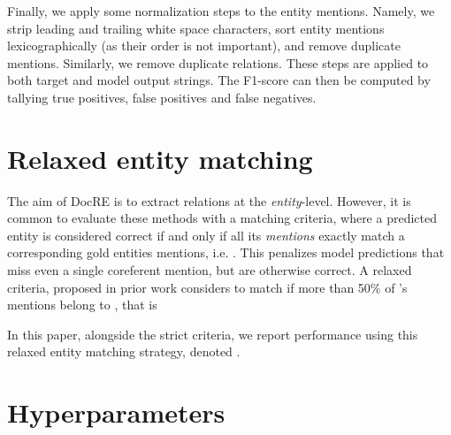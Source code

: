 \documentclass[11pt]{article}
\begin{document}
\noindent Finally, we apply some normalization steps to the entity mentions. Namely, we strip leading and trailing white space characters, sort entity mentions lexicographically (as their order is not important), and remove duplicate mentions. Similarly, we remove duplicate relations. These steps are applied to both target and model output strings. The F1-score can then be computed by tallying true positives, false positives and false negatives.


\section{Relaxed entity matching}
\label{appendix:relaxed-entity-matching}

The aim of DocRE is to extract relations at the \textit{entity}-level. However, it is common to evaluate these methods with a  matching criteria, where a predicted entity  is considered correct if and only if all its \textit{mentions} exactly match a corresponding gold entities mentions, i.e. . This penalizes model predictions that miss even a single coreferent mention, but are otherwise correct. A relaxed criteria, proposed in prior work \citep{jain-etal-2020-scirex} considers  to match  if more than 50\% of 's mentions belong to , that is



\noindent In this paper, alongside the strict criteria, we report performance using this relaxed entity matching strategy, denoted .

\section{Hyperparameters}
\label{appendix:hyperparameters}
\end{document}
